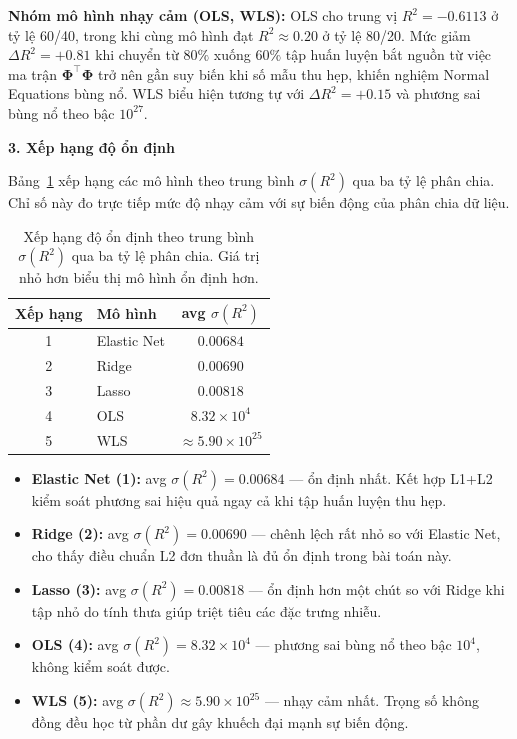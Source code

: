 \textbf{Nhóm mô hình nhạy cảm (OLS, WLS):}
OLS cho trung vị $R^2 = -0.6113$ ở tỷ lệ 60/40, trong khi cùng mô hình đạt $R^2 \approx 0.20$ ở tỷ lệ 80/20.
Mức giảm $\Delta R^2 = +0.81$ khi chuyển từ $80\%$ xuống $60\%$ tập huấn luyện bắt nguồn từ việc
ma trận $\boldsymbol{\Phi}^\top\boldsymbol{\Phi}$ trở nên gần suy biến khi số mẫu thu hẹp,
khiến nghiệm Normal Equations bùng nổ.
WLS biểu hiện tương tự với $\Delta R^2 = +0.15$ và phương sai bùng nổ theo bậc $10^{27}$.

\textbf{3. Xếp hạng độ ổn định}

Bảng~\ref{tab:sensitivity_stability} xếp hạng các mô hình theo trung bình $\sigma(R^2)$ qua ba tỷ lệ phân chia.
Chỉ số này đo trực tiếp mức độ nhạy cảm với sự biến động của phân chia dữ liệu.

\begin{table}[h]
\centering
\caption{Xếp hạng độ ổn định theo trung bình $\sigma(R^2)$ qua ba tỷ lệ phân chia.
Giá trị nhỏ hơn biểu thị mô hình ổn định hơn.}
\label{tab:sensitivity_stability}
\begin{tabular}{clc}
\toprule
\textbf{Xếp hạng} & \textbf{Mô hình} & \textbf{avg $\sigma(R^2)$} \\
\midrule
1 & Elastic Net & $0.00684$ \\
2 & Ridge       & $0.00690$ \\
3 & Lasso       & $0.00818$ \\
4 & OLS         & $8.32\times10^4$ \\
5 & WLS         & $\approx5.90\times10^{25}$ \\
\bottomrule
\end{tabular}
\end{table}

\begin{itemize}
    \item \textbf{Elastic Net (1):} avg $\sigma(R^2) = 0.00684$ --- ổn định nhất. Kết hợp L1+L2 kiểm soát phương sai hiệu quả ngay cả khi tập huấn luyện thu hẹp.
    \item \textbf{Ridge (2):} avg $\sigma(R^2) = 0.00690$ --- chênh lệch rất nhỏ so với Elastic Net, cho thấy điều chuẩn L2 đơn thuần là đủ ổn định trong bài toán này.
    \item \textbf{Lasso (3):} avg $\sigma(R^2) = 0.00818$ --- ổn định hơn một chút so với Ridge khi tập nhỏ do tính thưa giúp triệt tiêu các đặc trưng nhiễu.
    \item \textbf{OLS (4):} avg $\sigma(R^2) = 8.32\times10^4$ --- phương sai bùng nổ theo bậc $10^4$, không kiểm soát được.
    \item \textbf{WLS (5):} avg $\sigma(R^2) \approx 5.90\times10^{25}$ --- nhạy cảm nhất. Trọng số không đồng đều học từ phần dư gây khuếch đại mạnh sự biến động.
\end{itemize}

